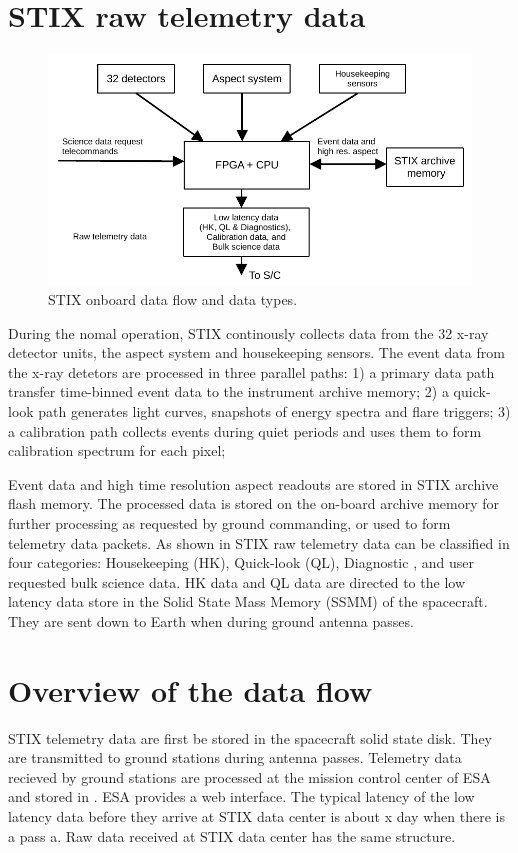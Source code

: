 \documentclass{aa}
\begin{document}
\section{STIX raw telemetry data}

\begin{figure}
    \centering
    \includegraphics[width=0.8\linewidth]{figures/onboardDataFlow.pdf}
    \caption{STIX onboard data flow and data types.}
    \label{fig:stix_onbard_data_flow}
\end{figure}

During the nomal operation, STIX continously collects data from the 32 x-ray detector units, the aspect system and
housekeeping sensors.
The event data from the x-ray detetors are processed in three parallel paths:
1) a primary data path transfer time-binned event data to the instrument archive memory;
2) a quick-look path generates light curves, snapshots of energy spectra and flare triggers;
3) a calibration path collects events during quiet periods and uses them to form calibration spectrum for each pixel;


Event data and high time resolution aspect
readouts are stored in STIX archive flash memory.
The processed data is  stored on the on-board archive memory for further processing as requested by ground commanding, or used to form telemetry data packets.
As shown in  STIX raw telemetry data can be classified in four categories: Housekeeping (HK), Quick-look (QL), Diagnostic
, and user requested bulk science data.
HK data and QL data are directed to the low latency data store in
the Solid State Mass Memory (SSMM) of the spacecraft. They are sent down to Earth when during ground antenna passes.



\section{Overview of the data flow}
STIX telemetry data are first be stored in the spacecraft solid state disk.
They are transmitted to ground stations during antenna passes.
Telemetry data recieved by ground stations are processed at the mission control center of ESA and
stored in .
ESA provides a web interface.
The typical latency of the low latency data before they arrive at STIX data center is about x day when there is a pass a.
Raw data received at STIX data center has the same structure.
\end{document}
